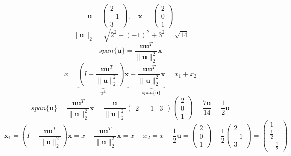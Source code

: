 $$ \mathbf{u} = \begin{pmatrix} 2 \\ -1 \\ 3 \end{pmatrix}, \quad \mathbf{x} = \begin{pmatrix} 2 \\ 0 \\ 1 \end{pmatrix} $$
$$ \| \mathbf{u} \|_2 = \sqrt{2^2 + (-1)^2 + 3^2} = \sqrt{14} $$
$$ span\{\mathbf{u}\} =  \frac{\mathbf{u}\mathbf{u}^T}{\| \mathbf{u} \|_2^2}\mathbf{x}$$
$$ x = \underbrace{(I - \frac{\mathbf{u}\mathbf{u}^T}{\| \mathbf{u} \|_2^2})\mathbf{x}}_{u^\perp} + \underbrace{\frac{\mathbf{u}\mathbf{u}^T}{\| \mathbf{u} \|_2^2}\mathbf{x}}_{span\{\mathbf{u}\}} = x_1 + x_2 $$
$$ span\{\mathbf{u}\} = \frac{\mathbf{u}\mathbf{u}^T}{\| \mathbf{u} \|_2^2}\mathbf{x} = \frac{\mathbf{u}}{\| \mathbf{u} \|_2^2} \begin{pmatrix} 2 & -1 & 3 \end{pmatrix} \begin{pmatrix} 2 \\ 0 \\ 1 \end{pmatrix} = \frac{7\mathbf{u}}{14} = \frac{1}{2}\mathbf{u} $$
$$ \mathbf{x}_1 = (I - \frac{\mathbf{u}\mathbf{u}^T}{\| \mathbf{u} \|_2^2})\mathbf{x} = x - \frac{\mathbf{u}\mathbf{u}^T}{\| \mathbf{u} \|_2^2}\mathbf{x} = x - x_2 = x - \frac{1}{2}\mathbf{u} = \begin{pmatrix}
    2 \\ 0 \\ 1
\end{pmatrix} - \frac{1}{2} \begin{pmatrix}
    2 \\ -1 \\ 3
\end{pmatrix} = \begin{pmatrix}
    1 \\ \frac{1}{2} \\ -\frac{1}{2}
\end{pmatrix} $$
